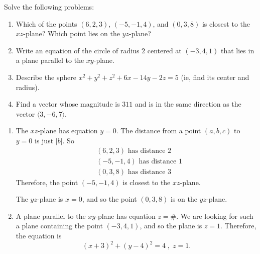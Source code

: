 \documentclass[handout]{ximera}
\begin{document}
\begin{problem}
Solve the following problems:
	\begin{enumerate}
	\item  Which of the points $(6,2,3)$, $(-5,-1,4)$, and $(0,3,8)$ is closest to the $xz$-plane?  
	Which point lies on the $yz$-plane?
	
	\item  Write an equation of the circle of radius $2$ centered at $(-3,4,1)$ that lies in a plane parallel to the $xy$-plane.
	
	\item  Describe the sphere $x^2 + y^2 + z^2 + 6x - 14y - 2z = 5$ (ie, find its center and radius).
	
	\item  Find a vector whose magnitude is $311$ and is in the same direction as the vector $\langle 3,-6,7 \rangle$.
	\end{enumerate}
	
	\begin{freeResponse}
	\begin{enumerate}
	\item  The $xz$-plane has equation $y=0$.  
	The distance from a point $(a,b,c)$ to $y=0$ is just $|b|$.  
	So
		\begin{align*}
		&(6,2,3) \text{ has distance }2  \\
		&(-5,-1,4) \text{ has distance }1  \\
		&(0,3,8) \text{ has distance }3
		\end{align*}
	Therefore, the point $(-5,-1,4)$ is closest to the $xz$-plane.  
	
	The $yz$-plane is $x=0$, and so the point $(0,3,8)$ is on the $yz$-plane.
	
	
	
	\item  A plane parallel to the $xy$-plane has equation $z = \#$.  
	We are looking for such a plane containing the point $(-3,4,1)$, and so the plane is $z=1$.  
	Therefore, the equation is
		\[
		\boxed{ (x+3)^2 + (y-4)^2 = 4 \;, \; z = 1.   }
		\]
		
		
	
%	
	

\end{enumerate}
\end{freeResponse}
\end{problem}
\end{document}
